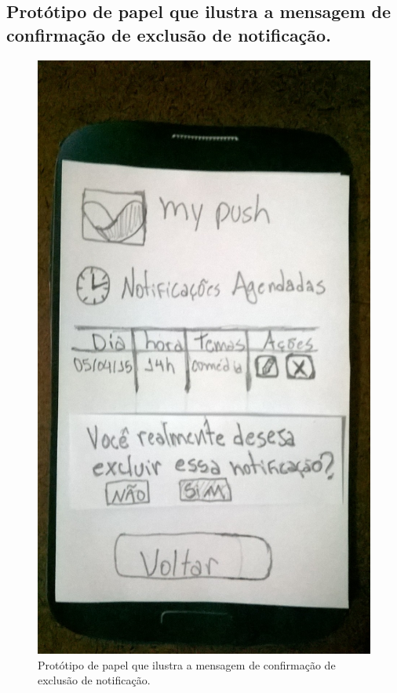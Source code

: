 \begin{apendicesenv}
    \pagebreak
    \section*{Protótipo de papel que ilustra a mensagem de confirmação de exclusão de notificação.}
    
      \begin{figure}[!htbp]
	\centering
	\includegraphics[scale=0.32, angle=-90]{editaveis/figuras/prototipo_papel_v1/confirmacao_excluir_notificacao}
	\caption{Protótipo de papel que ilustra a mensagem de confirmação de exclusão de notificação.}
	\label{confirmacao_excluir_notificacao_v1}
      \end{figure}
    

\end{apendicesenv}
